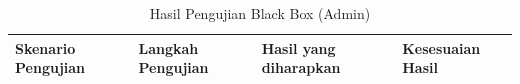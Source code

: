 \begin{longtable}{|p{3.8cm}|p{4.5cm}|p{4.5cm}|p{2cm}|} %
    \caption{Hasil Pengujian Black Box (Admin)} \label{tabel:hasil_bb_admin}                                                                                                                                                                                                                                                                                                                                                                                                                    \\
    \hline
    \textbf{Skenario Pengujian}                                     & \textbf{Langkah Pengujian}                                                                                                                                                                                                                          & \textbf{Hasil yang diharapkan}                                                                                                          & \textbf{Kesesuaian Hasil} \\
    \hline
    \endfirsthead




\end{longtable}
